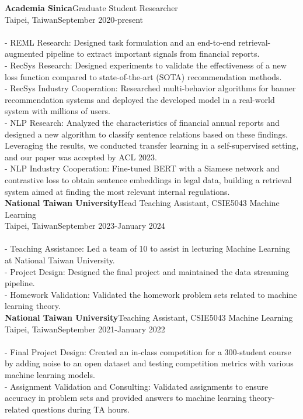 \documentclass{article}
\begin{document}
\noindent\textbf{Academia Sinica}\hfill Graduate Student Researcher\\
Taipei, Taiwan\hfill September 2020-present\\\\
- REML Research: Designed task formulation and an end-to-end retrieval-augmented pipeline to extract important signals from financial reports.\\ - RecSys Research: Designed experiments to validate the effectiveness of a new loss function compared to state-of-the-art (SOTA) recommendation methods.\\ - RecSys Industry Cooperation: Researched multi-behavior algorithms for banner recommendation systems and deployed the developed model in a real-world system with millions of users.\\ - NLP Research: Analyzed the characteristics of financial annual reports and designed a new algorithm to classify sentence relations based on these findings. Leveraging the results, we conducted transfer learning in a self-supervised setting, and our paper was accepted by ACL 2023.\\ - NLP Industry Cooperation: Fine-tuned BERT with a Siamese network and contrastive loss to obtain sentence embeddings in legal data, building a retrieval system aimed at finding the most relevant internal regulations.\\

\noindent\textbf{National Taiwan University}\hfill Head Teaching Assistant, CSIE5043 Machine Learning\\
Taipei, Taiwan\hfill September 2023-January 2024\\\\
- Teaching Assistance: Led a team of 10 to assist in lecturing Machine Learning at National Taiwan University.\\ - Project Design: Designed the final project and maintained the data streaming pipeline.\\ - Homework Validation: Validated the homework problem sets related to machine learning theory.\\

\noindent\textbf{National Taiwan University}\hfill Teaching Assistant, CSIE5043 Machine Learning\\
Taipei, Taiwan\hfill September 2021-January 2022\\\\
- Final Project Design: Created an in-class competition for a 300-student course by adding noise to an open dataset and testing competition metrics with various machine learning models.\\ - Assignment Validation and Consulting: Validated assignments to ensure accuracy in problem sets and provided answers to machine learning theory-related questions during TA hours.\\
\end{document}
